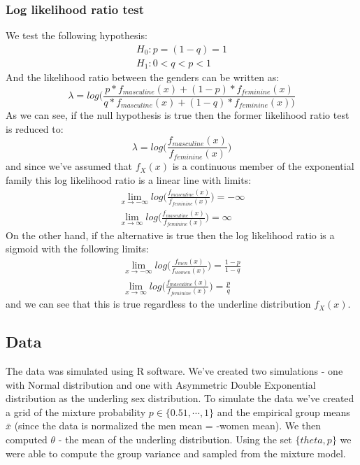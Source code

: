\documentclass[a4paper, 10pt, conference]{ieeeconf}      %
\begin{document}
\subsubsection{Log likelihood ratio test}
We test the following hypothesis:
\begin{gather}
H_0: p = (1-q) = 1 \\
H_1: 0 < q < p < 1 
\end{gather}
And the likelihood ratio between the genders can be written as:
\begin{equation}
\lambda = log \big( \frac{p * f_{masculine}(x) + (1-p) * f_{feminine}(x)}{q * f_{masculine}(x) + (1-q) * f_{feminine}(x)\big )}
\end{equation}
As we can see, if the null hypothesis is true then the former likelihood ratio test is reduced to:  
\begin{equation*}
\lambda = log \big( \frac{f_{masculine}(x)}{f_{feminine}(x)} \big) 
\end{equation*}
and since we've assumed that $f_X(x)$ is a continuous member of the exponential family this log likelihood ratio is a linear line with limits:
\begin{gather*}
\lim_{x \to -\infty} log \big( \frac{f_{masculine}(x)}{f_{feminine}(x)} \big) = -\infty \\
\lim_{x \to \infty} log \big( \frac{f_{masculine}(x)}{f_{feminine}(x)} \big) = \infty
\end{gather*}
On the other hand, if the alternative is true then the log likelihood ratio is a sigmoid with the following limits:
\begin{gather*}
\lim_{x \to -\infty} log \big( \frac{f_{men}(x)}{f_{women}(x)} \big) = \frac{1-p}{1-q}
\\
\lim_{x \to \infty} log \big( \frac{f_{masculine}(x)}{f_{feminine}(x)} \big) = \frac{p}{q}
\end{gather*}
and we can see that this is true regardless to the underline distribution $f_X(x)$.

\subsection{Data}
The data was simulated using R software. We've created two simulations - one with Normal distribution and one with Asymmetric Double Exponential distribution as the underling sex distribution. To simulate the data we've created a grid  of the mixture probability $p \in \{0.51,\cdots, 1\}$ and the empirical group means $\bar{x}$ (since the data is normalized the men mean = -women mean). We then computed $\theta$ - the mean of the underling distribution. Using the set $\{theta,p\}$ we were able to compute the group variance and sampled from the mixture model.
\end{document}
